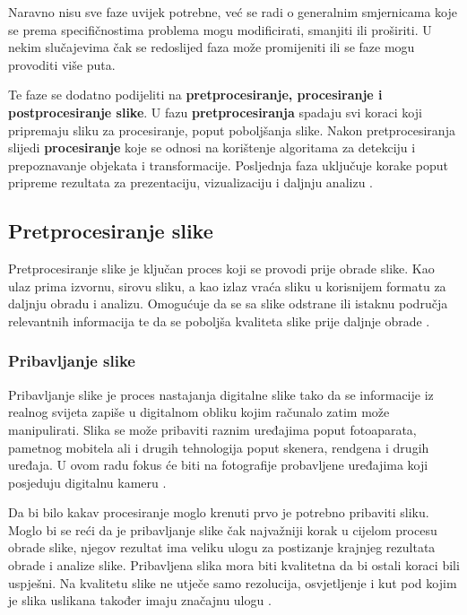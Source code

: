 \documentclass{foi}
\begin{document}
Naravno nisu sve faze uvijek potrebne, već se radi o generalnim smjernicama koje se prema specifičnostima problema mogu modificirati, smanjiti ili proširiti. U nekim slučajevima čak se redoslijed faza može promijeniti ili se faze mogu provoditi više puta.    

Te faze se dodatno podijeliti na \textbf{pretprocesiranje, procesiranje i postprocesiranje slike}. U fazu \textbf{pretprocesiranja} spadaju svi koraci koji pripremaju sliku za procesiranje, poput poboljšanja slike. Nakon pretprocesiranja slijedi \textbf{procesiranje} koje se odnosi na korištenje algoritama za detekciju i prepoznavanje objekata i transformacije. Posljednja faza uključuje korake poput pripreme rezultata za prezentaciju, vizualizaciju i daljnju analizu \cite{IamgeProcesingPhases}.

\pagebreak
\subsection{Pretprocesiranje slike}

Pretprocesiranje slike je ključan proces koji se provodi prije obrade slike. Kao ulaz prima izvornu, sirovu sliku, a kao izlaz vraća sliku u korisnijem formatu za daljnju obradu i analizu. Omogućuje da se sa slike odstrane ili istaknu područja relevantnih informacija te da se poboljša kvaliteta slike prije daljnje obrade \cite{Patel2023Oct}.

\subsubsection{Pribavljanje slike}

Pribavljanje slike je proces nastajanja digitalne slike tako da se informacije iz realnog svijeta zapiše u digitalnom obliku kojim računalo zatim može manipulirati. Slika se može pribaviti raznim uređajima poput fotoaparata, pametnog mobitela ali i drugih tehnologija poput skenera, rendgena i drugih uređaja. U ovom radu fokus će biti na fotografije probavljene uređajima koji posjeduju digitalnu kameru \cite{BibEntry2025Apr}.


Da bi bilo kakav procesiranje moglo krenuti prvo je potrebno pribaviti sliku. Moglo bi se reći da je pribavljanje slike čak najvažniji korak u cijelom procesu obrade slike, njegov rezultat ima veliku ulogu za postizanje krajnjeg rezultata obrade i analize slike. Pribavljena slika mora biti kvalitetna da bi ostali koraci bili uspješni. Na kvalitetu slike ne utječe samo rezolucija, osvjetljenje i kut pod kojim je slika uslikana također imaju značajnu ulogu \cite{BibEntry2025Apr}.
\end{document}
